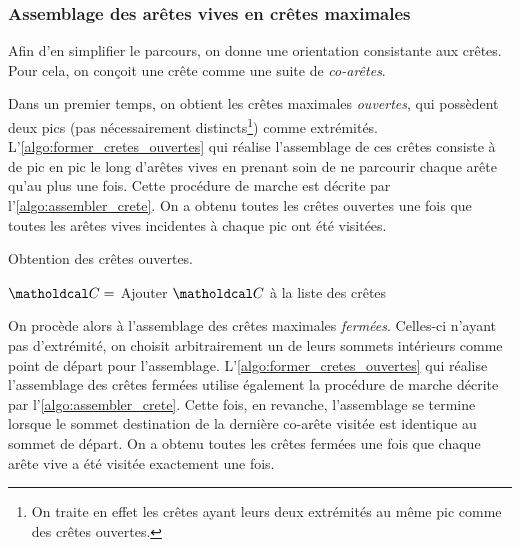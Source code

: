 \subsubsection{Assemblage des arêtes vives en crêtes maximales}
Afin d'en simplifier le parcours, on donne une orientation consistante aux crêtes. 
Pour cela, on conçoit une crête comme une suite de \textit{co-arêtes}.
\par
Dans un premier temps, on obtient les crêtes maximales \textit{ouvertes}, \ie qui possèdent deux pics (pas nécessairement distincts\footnote{On traite en effet les crêtes ayant leurs deux extrémités au même pic comme des crêtes ouvertes.}) comme extrémités. 
L'\autoref{algo:former_cretes_ouvertes} qui réalise l'assemblage de ces crêtes consiste à  de pic en pic le long d'arêtes vives en prenant soin de ne parcourir chaque arête qu'au plus une fois. 
Cette procédure de marche est décrite par l'\autoref{algo:assembler_crete}. 
On a obtenu toutes les crêtes ouvertes une fois que toutes les arêtes vives incidentes à chaque pic ont été visitées. 


\begin{algorithm}
	\caption{Obtention des crêtes ouvertes.}\label{algo:former_cretes_ouvertes}
	\begin{algorithmic}[1]
					\State $\crete = $ 
					\State Ajouter $\crete$ à la liste des crêtes
				\EndFor
			\EndFor
	\end{algorithmic}
\end{algorithm}

\par
On procède alors à l'assemblage des crêtes maximales \textit{fermées}. 
Celles-ci n'ayant pas d'extrémité, on choisit arbitrairement un de leurs sommets intérieurs comme point de départ pour l'assemblage. 
L'\autoref{algo:former_cretes_ouvertes} qui réalise l'assemblage des crêtes fermées utilise également la procédure de marche décrite par l'\autoref{algo:assembler_crete}. 
Cette fois, en revanche, l'assemblage se termine lorsque le sommet destination de la dernière co-arête visitée est identique au sommet de départ. 
On a obtenu toutes les crêtes fermées une fois que chaque arête vive a été visitée exactement une fois. 

